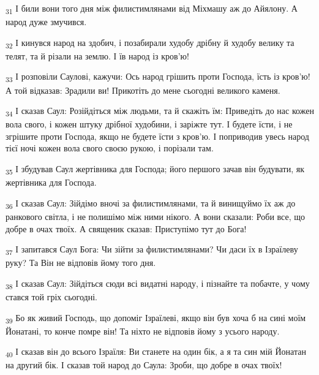 \begin{tcolorbox}
\textsubscript{31} І били вони того дня між филистимлянами від Міхмашу аж до Айялону. А народ дуже змучився.
\end{tcolorbox}
\begin{tcolorbox}
\textsubscript{32} І кинувся народ на здобич, і позабирали худобу дрібну й худобу велику та телят, та й різали на землю. І їв народ із кров'ю!
\end{tcolorbox}
\begin{tcolorbox}
\textsubscript{33} І розповіли Саулові, кажучи: Ось народ грішить проти Господа, їсть із кров'ю! А той відказав: Зрадили ви! Прикотіть до мене сьогодні великого каменя.
\end{tcolorbox}
\begin{tcolorbox}
\textsubscript{34} І сказав Саул: Розійдіться між людьми, та й скажіть їм: Приведіть до нас кожен вола свого, і кожен штуку дрібної худобини, і заріжте тут. І будете їсти, і не згрішите проти Господа, якщо не будете їсти з кров'ю. І поприводив увесь народ тієї ночі кожен вола свого своєю рукою, і порізали там.
\end{tcolorbox}
\begin{tcolorbox}
\textsubscript{35} І збудував Саул жертівника для Господа; його першого зачав він будувати, як жертівника для Господа.
\end{tcolorbox}
\begin{tcolorbox}
\textsubscript{36} І сказав Саул: Зійдімо вночі за филистимлянами, та й винищуймо їх аж до ранкового світла, і не полишімо між ними нікого. А вони сказали: Роби все, що добре в очах твоїх. А священик сказав: Приступімо тут до Бога!
\end{tcolorbox}
\begin{tcolorbox}
\textsubscript{37} І запитався Саул Бога: Чи зійти за филистимлянами? Чи даси їх в Ізраїлеву руку? Та Він не відповів йому того дня.
\end{tcolorbox}
\begin{tcolorbox}
\textsubscript{38} І сказав Саул: Зійдіться сюди всі видатні народу, і пізнайте та побачте, у чому стався той гріх сьогодні.
\end{tcolorbox}
\begin{tcolorbox}
\textsubscript{39} Бо як живий Господь, що допоміг Ізраїлеві, якщо він був хоча б на сині моїм Йонатані, то конче помре він! Та ніхто не відповів йому з усього народу.
\end{tcolorbox}
\begin{tcolorbox}
\textsubscript{40} І сказав він до всього Ізраїля: Ви станете на один бік, а я та син мій Йонатан на другий бік. І сказав той народ до Саула: Зроби, що добре в очах твоїх!
\end{tcolorbox}
